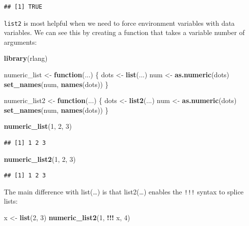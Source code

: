 \documentclass[]{book}
\newenvironment{Shaded}{\begin{snugshade}}{\end{snugshade}}
\newcommand{\ControlFlowTok}[1]{\textcolor[rgb]{0.13,0.29,0.53}{\textbf{#1}}}
\newcommand{\DecValTok}[1]{\textcolor[rgb]{0.00,0.00,0.81}{#1}}
\newcommand{\KeywordTok}[1]{\textcolor[rgb]{0.13,0.29,0.53}{\textbf{#1}}}
\newcommand{\NormalTok}[1]{#1}
\newcommand{\OperatorTok}[1]{\textcolor[rgb]{0.81,0.36,0.00}{\textbf{#1}}}
\newcommand{\StringTok}[1]{\textcolor[rgb]{0.31,0.60,0.02}{#1}}
\begin{document}
\begin{verbatim}
## [1] TRUE
\end{verbatim}

\texttt{list2} is most helpful when we need to force environment variables with data variables. We can see this by creating a function that takes a variable number of arguments:

\begin{Shaded}
\begin{Highlighting}[]
\KeywordTok{library}\NormalTok{(rlang)}

\NormalTok{numeric_list <-}\StringTok{ }\ControlFlowTok{function}\NormalTok{(...) \{}
\NormalTok{  dots <-}\StringTok{ }\KeywordTok{list}\NormalTok{(...)}
\NormalTok{  num <-}\StringTok{ }\KeywordTok{as.numeric}\NormalTok{(dots)}
  \KeywordTok{set_names}\NormalTok{(num, }\KeywordTok{names}\NormalTok{(dots))}
\NormalTok{\}}

\NormalTok{numeric_list2 <-}\StringTok{ }\ControlFlowTok{function}\NormalTok{(...) \{}
\NormalTok{  dots <-}\StringTok{ }\KeywordTok{list2}\NormalTok{(...)}
\NormalTok{  num <-}\StringTok{ }\KeywordTok{as.numeric}\NormalTok{(dots)}
  \KeywordTok{set_names}\NormalTok{(num, }\KeywordTok{names}\NormalTok{(dots))}
\NormalTok{\}}

\KeywordTok{numeric_list}\NormalTok{(}\DecValTok{1}\NormalTok{, }\DecValTok{2}\NormalTok{, }\DecValTok{3}\NormalTok{)}
\end{Highlighting}
\end{Shaded}

\begin{verbatim}
## [1] 1 2 3
\end{verbatim}

\begin{Shaded}
\begin{Highlighting}[]
\KeywordTok{numeric_list2}\NormalTok{(}\DecValTok{1}\NormalTok{, }\DecValTok{2}\NormalTok{, }\DecValTok{3}\NormalTok{)}
\end{Highlighting}
\end{Shaded}

\begin{verbatim}
## [1] 1 2 3
\end{verbatim}

The main difference with list(\ldots{}) is that list2(\ldots{}) enables the \texttt{!!!} syntax to splice lists:

\begin{Shaded}
\begin{Highlighting}[]
\NormalTok{x <-}\StringTok{ }\KeywordTok{list}\NormalTok{(}\DecValTok{2}\NormalTok{, }\DecValTok{3}\NormalTok{)}
\KeywordTok{numeric_list2}\NormalTok{(}\DecValTok{1}\NormalTok{, }\OperatorTok{!!!}\StringTok{ }\NormalTok{x, }\DecValTok{4}\NormalTok{)}
\end{Highlighting}
\end{Shaded}
\end{document}
